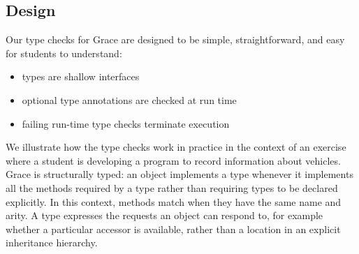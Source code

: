 



\subsection{Design}





Our type checks for Grace are designed to be simple,
straightforward, and easy for students to understand:
\begin{itemize}
  \item types are shallow interfaces
  \item optional type annotations are checked at run time
  \item failing run-time type checks terminate execution
\end{itemize}


We illustrate how the type checks work in practice
in the context of an exercise where a student is developing
a program to record information about vehicles.
%
Grace is structurally typed\citep{graceOnward12}:
an object implements a type whenever it
implements all the methods required by a 
type rather than requiring types to be declared
explicitly.
In this context, methods match when they have the same name and arity.
A type expresses the requests
an object can respond to, for example whether a particular accessor is
available,  rather than a location in an explicit inheritance
hierarchy.

